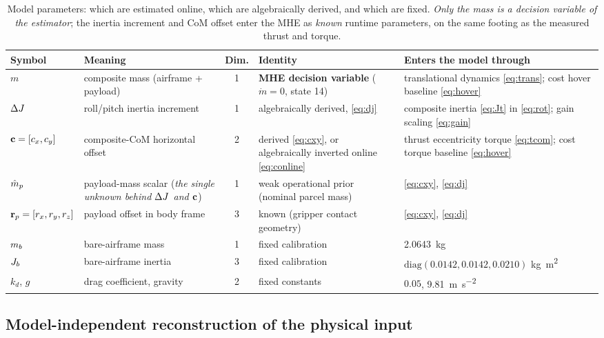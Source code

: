 \begin{table}[t]
\caption{Model parameters: which are estimated online, which are algebraically
derived, and which are fixed. \emph{Only the mass is a decision variable of the
estimator}; the inertia increment and CoM offset enter the MHE as \emph{known}
runtime parameters, on the same footing as the measured thrust and torque.}
\label{tab:params}
\centering
\footnotesize
\begin{tabular}{@{}l p{} c p{} p{}@{}}
\toprule
Symbol & Meaning & Dim. & Identity & Enters the model through \\
\midrule
$m$ & composite mass (airframe + payload) & 1 & \textbf{MHE decision variable} ($\dot m = 0$, state 14) & translational dynamics \eqref{eq:trans}; cost hover baseline \eqref{eq:hover} \\
$\Delta J$ & roll/pitch inertia increment & 1 & algebraically derived, \eqref{eq:dj} & composite inertia \eqref{eq:Jt} in \eqref{eq:rot}; gain scaling \eqref{eq:gain} \\
$\mathbf{c} = [c_x, c_y]$ & composite-CoM horizontal offset & 2 & derived \eqref{eq:cxy}, or algebraically inverted online \eqref{eq:conline} & thrust eccentricity torque \eqref{eq:tcom}; cost torque baseline \eqref{eq:hover} \\
\midrule
$\hat{m}_p$ & payload-mass scalar (\emph{the single unknown behind $\Delta J$ and $\mathbf{c}$}) & 1 & weak operational prior (nominal parcel mass) & \eqref{eq:cxy}, \eqref{eq:dj} \\
$\mathbf{r}_p = [r_x, r_y, r_z]$ & payload offset in body frame & 3 & known (gripper contact geometry) & \eqref{eq:cxy}, \eqref{eq:dj} \\
\midrule
$m_b$ & bare-airframe mass & 1 & fixed calibration & \SI{2.0643}{\kg} \\
$J_b$ & bare-airframe inertia & 3 & fixed calibration & $\mathrm{diag}(0.0142, 0.0142, 0.0210)$ \si{\kg\meter\squared} \\
$k_d$, $g$ & drag coefficient, gravity & 2 & fixed constants & $0.05$, \SI{9.81}{\meter\per\second\squared} \\
\bottomrule
\end{tabular}
\end{table}

\subsection{Model-independent reconstruction of the physical input}\label{sec:model:phys}

